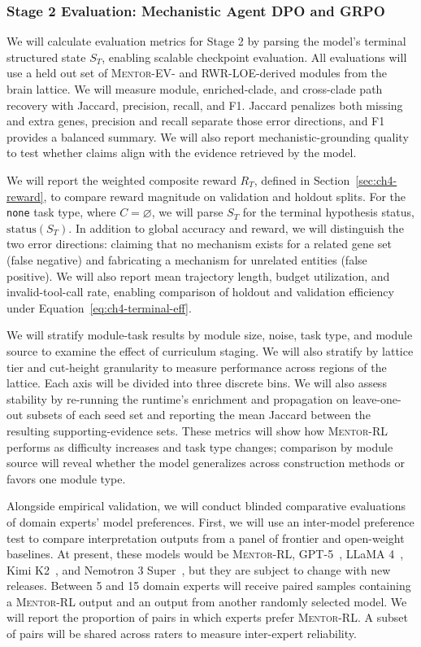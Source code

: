 \subsubsection{Stage 2 Evaluation: Mechanistic Agent DPO and GRPO}\label{sec:ch4-stage2-eval}
We will calculate evaluation metrics for Stage 2 by parsing the model's terminal structured state $S_T$, enabling scalable checkpoint evaluation. All evaluations will use a held out set of \textsc{Mentor-EV}- and RWR-LOE-derived modules from the brain lattice. We will measure module, enriched-clade, and cross-clade path recovery with Jaccard, precision, recall, and F1. Jaccard penalizes both missing and extra genes, precision and recall separate those error directions, and F1 provides a balanced summary. We will also report mechanistic-grounding quality to test whether claims align with the evidence retrieved by the model.

We will report the weighted composite reward $R_T$, defined in Section~\ref{sec:ch4-reward}, to compare reward magnitude on validation and holdout splits. For the \texttt{none} task type, where $C = \varnothing$, we will parse $S_T$ for the terminal hypothesis status, $\mathrm{status}(S_T)$. In addition to global accuracy and reward, we will distinguish the two error directions: claiming that no mechanism exists for a related gene set (false negative) and fabricating a mechanism for unrelated entities (false positive). We will also report mean trajectory length, budget utilization, and invalid-tool-call rate, enabling comparison of holdout and validation efficiency under Equation~\ref{eq:ch4-terminal-eff}.

We will stratify module-task results by module size, noise, task type, and module source to examine the effect of curriculum staging. We will also stratify by lattice tier and cut-height granularity to measure performance across regions of the lattice. Each axis will be divided into three discrete bins. We will also assess stability by re-running the runtime's enrichment and propagation on leave-one-out subsets of each seed set and reporting the mean Jaccard between the resulting supporting-evidence sets. These metrics will show how \textsc{Mentor-RL} performs as difficulty increases and task type changes; comparison by module source will reveal whether the model generalizes across construction methods or favors one module type.

Alongside empirical validation, we will conduct blinded comparative evaluations of domain experts' model preferences. First, we will use an inter-model preference test to compare interpretation outputs from a panel of frontier and open-weight baselines. At present, these models would be \textsc{Mentor-RL}, GPT-5~\cite{gpt5}, LLaMA 4~\cite{llama4}, Kimi K2~\cite{kimik2}, and Nemotron 3 Super~\cite{nemotron3}, but they are subject to change with new releases. Between 5 and 15 domain experts will receive paired samples containing a \textsc{Mentor-RL} output and an output from another randomly selected model. We will report the proportion of pairs in which experts prefer \textsc{Mentor-RL}. A subset of pairs will be shared across raters to measure inter-expert reliability.

